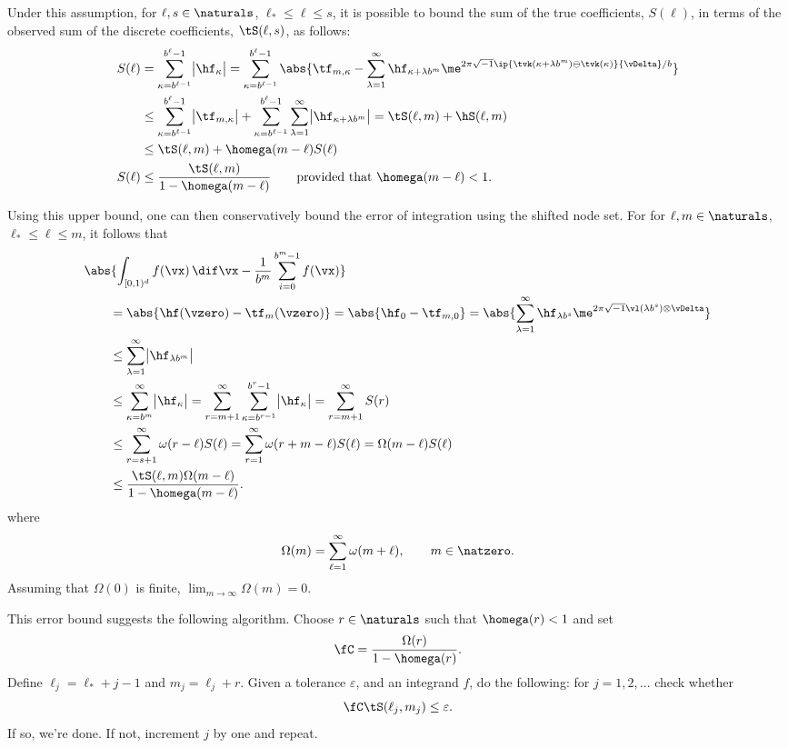 \documentclass[]{elsarticle}
\newcommand{\fudge}{\fC}
\theoremstyle{definition}
\newcommand{\cube}{[0,1)^d}
\begin{document}
Under this assumption, for $\ell, s \in \naturals$, $\ell_* \le \ell \le s$, it is possible to bound the sum of the true coefficients, $S(\ell)$, in terms of the observed sum of the discrete coefficients, $\tS(\ell,s)$, as follows:
\begin{align*}
S(\ell) &= \sum_{\kappa=b^{\ell-1}}^{b^{\ell}-1} \bigl \lvert \hf_{\kappa}\bigr\rvert= \sum_{\kappa=b^{\ell-1}}^{b^{\ell}-1} \abs{\tf_{m,\kappa} - \sum_{\lambda=1}^{\infty} \hf_{\kappa+\lambda b^{m}} \me^{2 \pi \sqrt{-1} \ip{\tvk(\kappa+\lambda b^{m}) \ominus \tvk(\kappa)}{\vDelta}/b}}\\
&\le \sum_{\kappa=b^{\ell-1}}^{b^{\ell}-1} \bigl \lvert \tf_{m,\kappa} \bigr\rvert + \sum_{\kappa=b^{\ell-1}}^{b^{\ell}-1} \sum_{\lambda=1}^{\infty} \bigl \lvert \hf_{\kappa+\lambda b^{m}}\bigr\rvert = \tS(\ell,m) + \hS(\ell,m) \\
&\le \tS(\ell,m) + \homega(m-\ell) S(\ell) \\
S(\ell) & \le \frac{\tS(\ell,m)}{1 - \homega(m-\ell)} \qquad \text{provided that } \homega(m-\ell) < 1.
\end{align*}

Using this upper bound, one can then conservatively bound the error of integration using the shifted node set.  For for $\ell, m \in \naturals$, $\ell_* \le \ell \le m$, it follows that
\begin{align*}
\MoveEqLeft{\abs{\int_{\cube} f(\vx) \, \dif \vx - \frac{1}{b^m} \sum_{i=0}^{b^m-1} f(\vx) }}\\
&= \abs{\hf(\vzero) - \tf_m(\vzero)} = \abs{\hf_0 - \tf_{m,0}} = \abs{\sum_{\lambda=1}^{\infty} \hf_{\lambda b^{s}} \me^{2 \pi \sqrt{-1} \vl(\lambda b^{s}) \otimes \vDelta}}\\
&\le \sum_{\lambda=1}^{\infty} \bigl \lvert \hf_{\lambda b^{m}} \bigr \rvert \\
&\le \sum_{\kappa=b^{m}}^{\infty} \bigl \lvert \hf_{\kappa} \bigr \rvert = \sum_{r=m+1}^{\infty} \sum_{\kappa=b^{r-1}}^{b^{r}-1} \bigl \lvert \hf_{\kappa} \bigr \rvert = \sum_{r=m+1}^{\infty} S(r)\\
&\le \sum_{r=s+1}^{\infty} \omega(r-\ell) S(\ell) =   \sum_{r=1}^{\infty} \omega(r+m-\ell) S(\ell) =  \Omega(m-\ell) S(\ell)\\
& \le \frac{\tS(\ell,m)\Omega(m-\ell)}{1 - \homega(m-\ell)}.
\end{align*}
where
\[
\Omega(m)=\sum_{\ell=1}^{\infty} \omega(m+ \ell), \qquad m \in \natzero.
\]
Assuming that $\Omega(0)$ is finite, $\lim_{m \to \infty} \Omega(m) = 0$.

This error bound suggests the following algorithm.  Choose $r \in \naturals$ such that $\homega(r)<1$ and set
\[
\fudge = \frac{\Omega(r)}{1 - \homega(r)}.
\]
Define $\ell_j=\ell_*+j-1$ and $m_j=\ell_j+r$.  Given a tolerance $\varepsilon$, and an integrand $f$, do the following:  for $j=1, 2, \ldots$ check whether
\[
\fudge \tS(\ell_j,m_j) \le \varepsilon.
\]
If so, we're done.  If not, increment $j$ by one and repeat.




\end{document}
